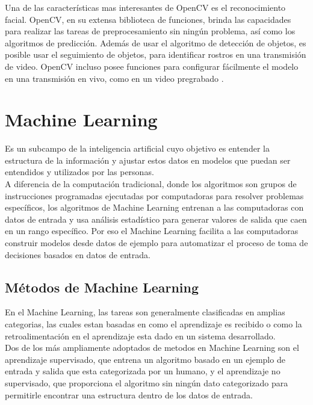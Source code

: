 Una de las características mas interesantes de OpenCV es el reconocimiento facial. OpenCV, en su extensa biblioteca de funciones, brinda las capacidades para realizar las tareas de preprocesamiento sin ningún problema, así como los algoritmos de predicción. Además de usar el algoritmo de detección de objetos, es posible usar el seguimiento de objetos, para identificar rostros en una transmisión de video. OpenCV incluso posee funciones para configurar fácilmente el modelo en una transmisión en vivo, como en un video pregrabado \cite{medium:opencv}. 


\section{Machine Learning}
Es un subcampo de la inteligencia artificial cuyo objetivo es entender la estructura de la información y ajustar estos datos en modelos que puedan ser entendidos y utilizados por las personas.\\

A diferencia de la computación tradicional, donde los algoritmos son grupos de instrucciones programadas ejecutadas por computadoras para resolver problemas específicos, los algoritmos de Machine Learning entrenan a las computadoras con datos de entrada y usa análisis estadístico para generar valores de salida que caen en un rango específico. Por eso el Machine Learning facilita a las computadoras construir modelos desde datos de ejemplo para automatizar el proceso de toma de decisiones basados en datos de entrada.\\

\subsection{Métodos de Machine Learning}
En el Machine Learning, las tareas son generalmente clasificadas en amplias categorias, las cuales estan basadas en como el aprendizaje es recibido o como la retroalimentación en el aprendizaje esta dado en un sistema desarrollado.\\

Dos de los más ampliamente adoptados de metodos en Machine Learning son el aprendizaje supervisado, que entrena un algoritmo basado en un ejemplo de entrada y salida que esta categorizada por un humano, y el aprendizaje no supervisado, que proporciona el algoritmo sin ningún dato categorizado para permitirle encontrar una estructura dentro de los datos de entrada.\\

